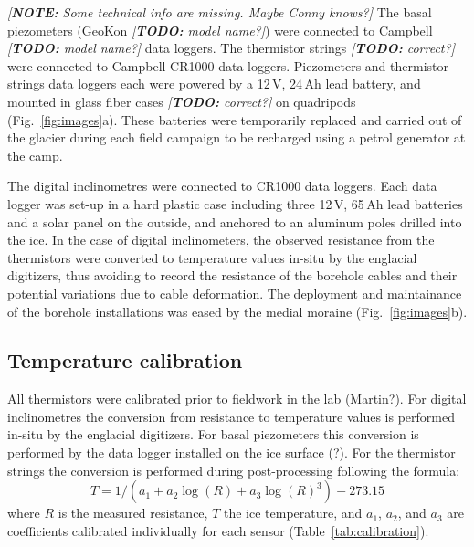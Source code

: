 \documentclass[utf8]{article}
\newcommand{\note}[1]{\textcolor{c0}{\emph{[\textbf{NOTE:} #1]}}}
\newcommand{\todo}[1]{\textcolor{c3}{\emph{[\textbf{TODO:} #1]}}}
\begin{document}
    \note{Some technical info are missing. Maybe Conny knows?}
    The basal piezometers (GeoKon \todo{model name?}) were connected to
    Campbell \todo{model name?} data loggers. The thermistor strings
    \citep[NTC~Fenwal 135-103FAG-J01,][]{Ryser.2014} \todo{correct?} were
    connected to Campbell CR1000 data loggers. Piezometers and thermistor
    strings data loggers each were powered by a 12\,V, 24\,Ah lead battery, and
    mounted in glass fiber cases \todo{correct?} on quadripods
    (Fig.~\ref{fig:images}a). These batteries were temporarily replaced and
    carried out of the glacier during each field campaign to be recharged using
    a petrol generator at the camp.

    The digital inclinometres \citep[DIBOSS,][]{Ryser.2014, Ryser.etal.2014,
    Ryser.etal.2014a} were connected to CR1000 data loggers. Each data logger
    was set-up in a hard plastic case including three 12\,V, 65\,Ah lead
    batteries and a solar panel on the outside, and anchored to an aluminum
    poles drilled into the ice.
    In the case of digital inclinometers, the observed resistance from the
    thermistors were converted to temperature values in-situ by the englacial
    digitizers, thus avoiding to record the resistance of the borehole cables
    and their potential variations due to cable deformation. The deployment and
    maintainance of the borehole installations was eased by the medial moraine
    (Fig.~\ref{fig:images}b).


\subsection{Temperature calibration}

    All thermistors were calibrated prior to fieldwork in the lab (Martin?).
    For digital inclinometres the conversion from resistance to temperature
    values is performed in-situ by the englacial digitizers. For basal
    piezometers this conversion is performed by the data logger installed on
    the ice surface (?). For the thermistor strings the conversion is performed
    during post-processing following the formula:
    \begin{equation}
      T = 1 / (a_1 + a_2 \log(R) + a_3 \log(R)^3) - 273.15
    \end{equation}
    where $R$ is the measured resistance, $T$ the ice temperature, and $a_1$,
    $a_2$, and $a_3$ are coefficients calibrated individually for each sensor
    (Table~\ref{tab:calibration}).
\end{document}
